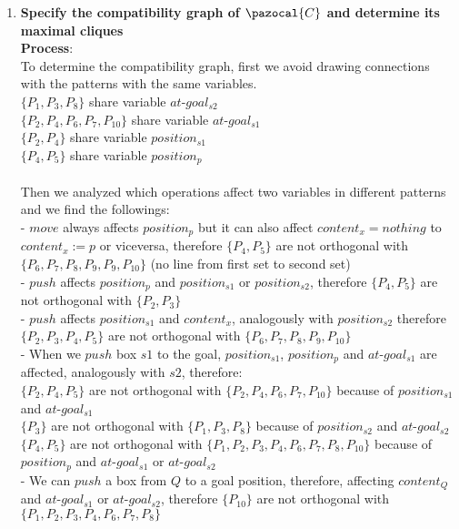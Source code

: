 \documentclass[11pt,a4paper]{article}
\begin{document}
\begin{enumerate}[label=(\alph*), listparindent=1.5em]
	\item \textbf{Specify the compatibility graph of $\pazocal{C}$ and
	determine its maximal cliques}\\
	\textbf{Process}:\\
	To determine the compatibility graph, first we avoid drawing connections with the patterns with the same variables.\\
	$\{ P_1, P_3, P_8 \}$ share variable $at$-$goal_{s2}$\\
	$\{ P_2, P_4, P_6, P_7, P_{10} \}$ share variable $at$-$goal_{s1}$\\
	$\{ P_2, P_4\}$ share variable $position_{s1}$\\
	$\{ P_4, P_5\}$ share variable $position_{p}$\\\\
	Then we analyzed which operations affect two variables in different patterns and we find the followings:\\
	- $move$ always affects $position_p$ but it can also affect $content_x = nothing$ to $content_x := p$ or viceversa, therefore $\{ P_4, P_5 \}$ are not orthogonal with $\{P_6, P_7, P_8, P_9, P_9, P_{10}\}$ (no line from first set to second set)\\
	- $push$ affects $position_p$ and $position_{s1}$ or $position_{s2}$, therefore $\{ P_4, P_5 \}$ are not orthogonal with $\{P_2, P_3\}$\\
	- $push$ affects $position_{s1}$ and $content_x$, analogously with $position_{s2}$ therefore $\{ P_2, P_3, P_4, P_5\}$ are not orthogonal with $\{P_6, P_7, P_8, P_9, P_10\}$\\
	- When we $push$ box $s1$ to the goal, $position_{s1}$, $position_p$ and $at$-$goal_{s1}$ are affected, analogously with $s2$, therefore:\\
	$\{ P_2, P_4, P_5 \}$ are not orthogonal with $\{P_2, P_4, P_6, P_7, P_{10}\}$ because of $position_{s1}$ and $at$-$goal_{s1}$\\
	$\{ P_3\}$ are not orthogonal with $\{P_1, P_3, P_8\}$ because of $position_{s2}$ and $at$-$goal_{s2}$\\
	$\{ P_4, P_5\}$ are not orthogonal with $\{P_1, P_2, P_3, P_4, P_6, P_7, P_8, P_{10}\}$ because of $position_{p}$ and $at$-$goal_{s1}$ or $at$-$goal_{s2}$\\
	- We can $push$ a box from $Q$ to a goal position, therefore, affecting $content_Q$ and $at$-$goal_{s1}$ or $at$-$goal_{s2}$, therefore $\{ P_{10}\}$ are not orthogonal with $\{P_1, P_2, P_3, P_4, P_6, P_7, P_8\}$\\

\end{enumerate}
\end{document}
